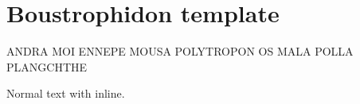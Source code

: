 \documentclass[12pt]{article}
\begin{document}
\section*{Boustrophidon template}


\bigskip

\startBoustrophidon[Type=Archaic]
ANDRA MOI ENNEPE MOUSA POLYTROPON OS MALA POLLA PLANGCHTHE
\stopBoustrophidon

\bigskip

Normal text with  inline.
\end{document}
